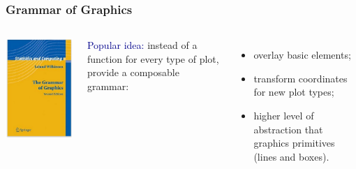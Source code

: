\documentclass[compress]{beamer}
\begin{document}
\begin{frame}
\frametitle{Grammar of Graphics}

\begin{columns}
\includegraphics[width=\linewidth]{grammar-of-graphics.png}

\textcolor{darkblue}{Popular idea:} instead of a function for every type of plot, provide a composable grammar:

\begin{itemize}
\item overlay basic elements;
\item transform coordinates for new plot types;
\item higher level of abstraction that graphics primitives (lines and boxes).
\end{itemize}


\end{columns}
\end{frame}
\end{document}
